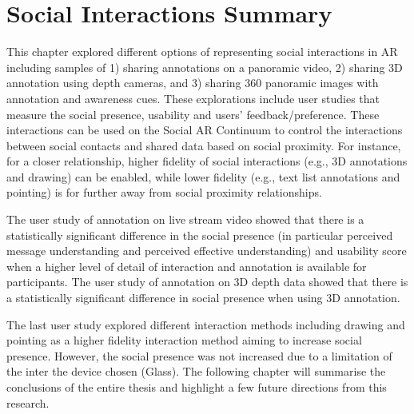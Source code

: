 \pagebreak
\section{Social Interactions Summary}

This chapter explored different options of representing social interactions in AR including samples of 1) sharing annotations on a panoramic video, 2) sharing 3D annotation using depth cameras, and 3) sharing 360 panoramic images with annotation and awareness cues. These explorations include user studies that measure the social presence, usability and users' feedback/preference. These interactions can be used on the Social AR Continuum to control the interactions between social contacts and shared data based on social proximity. For instance, for a closer relationship, higher fidelity of social interactions (e.g., 3D annotations and drawing) can be enabled, while lower fidelity (e.g., text list annotations and pointing) is for further away from social proximity relationships.

The user study of annotation on live stream video showed that there is a statistically significant difference in the social presence (in particular perceived message understanding and perceived effective understanding) and usability score when a higher level of detail of interaction and annotation is available for participants. The user study of annotation on 3D depth data showed that there is a statistically significant difference in social presence when using 3D annotation. 

The last user study explored different interaction methods including drawing and pointing as a higher fidelity interaction method aiming to increase social presence. However, the social presence was not increased due to a limitation of the inter the device chosen (Glass).
The following chapter will summarise the conclusions of the entire thesis and highlight a few future directions from this research.

